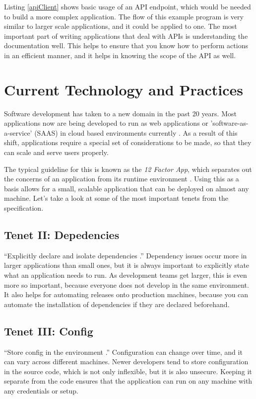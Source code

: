 \documentclass[12pt, oneside, a4paper]{book}
\begin{document}
      Listing \ref{apiClient} shows basic usage of an API endpoint, which would be needed to build a more complex application.
      The flow of this example program is very similar to larger scale applications, and it could be applied to one.
      The most important part of writing applications that deal with APIs is understanding the documentation well.
      This helps to ensure that you know how to perform actions in an efficient manner, and it helps in knowing the scope of the API as well.

      \section{Current Technology and Practices}
      Software development has taken to a new domain in the past 20 years.
      Most applications now are being developed to run as web applications or 'software-as-a-service' (SAAS) in cloud based environments currently \autocite{WhatCloudComputing}.
      As a result of this shift, applications require a special set of considerations to be made, so that they can scale and serve users properly.

      The typical guideline for this is known as the \textit{12 Factor App\footnotemark}, which separates out the concerns of an application from its runtime environment \autocite{wigginsTwelveFactorApp2017}.
      Using this as a basis allows for a small, scalable application that can be deployed on almost any machine.
      Let's take a look at some of the most important tenets from the specification.

      \subsection{Tenet II: Depedencies}
      ``Explicitly declare and isolate dependencies \autocite{wigginsTwelveFactorApp2017}.''
      Dependency issues occur more in larger applications than small ones, but it is always important to explicitly state what an application needs to run.
      As development teams get larger, this is even more so important, because everyone does not develop in the same environment.
      It also helps for automating releases onto production machines, because you can automate the installation of dependencies if they are declared beforehand.

      \subsection{Tenet III: Config}
      ``Store config in the environment \autocite{wigginsTwelveFactorApp2017}.''
      Configuration can change over time, and it can vary across different machines.
      Newer developers tend to store configuration in the source code, which is not only inflexible, but it is also unsecure.
      Keeping it separate from the code ensures that the application can run on any machine with any credentials or setup.
\end{document}
